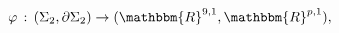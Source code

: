 \begin{equation}
 \varphi\,:\,(\Sigma_2,\partial\Sigma_2)\rightarrow
 (\mathbbm{R}^{9,1},\mathbbm{R}^{p,1}),
\end{equation}

